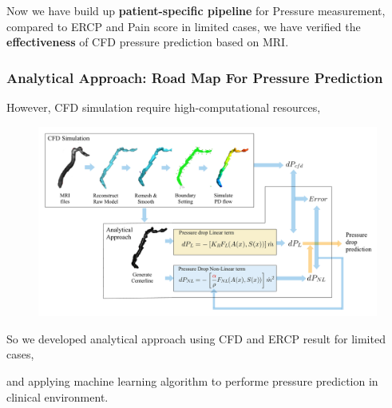 \documentclass{beamer}
\begin{document}
\begin{frame}
\begin{columns}
    \end{columns}

    Now we have build up \textbf{patient-specific pipeline} 
    for Pressure measurement, compared to ERCP and 
    Pain score in limited cases, we have verified 
    the \textbf{effectiveness} of CFD pressure prediction
    based on MRI.

\end{frame}



\begin{frame}
    \fontsize{8pt}{10pt}\selectfont
    \frametitle{Analytical Approach: Road Map For Pressure Prediction }
    
    However, CFD simulation require high-computational
    resources, 


        
    \begin{figure}[H]
        \centering
        \includegraphics[width=\textwidth]{figures/Process-Total.jpg}
    \end{figure}

    So we developed analytical approach 
    using CFD and ERCP result for limited cases,


    and applying machine learning algorithm to performe
    pressure prediction in clinical environment.
    

    

\end{frame}
\end{document}
